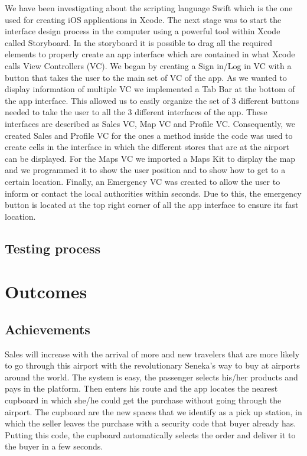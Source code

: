 \documentclass[12pt]{article}
\begin{document}
We have been investigating about the scripting language Swift which is the one used for creating iOS applications in Xcode. The next stage was to start the interface design process in the computer using a powerful tool within Xcode called Storyboard. In the storyboard it is possible to drag all the required elements to properly create an app interface which are contained in what Xcode calls View Controllers (VC). We began by creating a Sign in/Log in VC with a button that takes the user to the main set of VC of the app. As we wanted to display information of multiple VC we implemented a Tab Bar at the bottom of the app interface. This allowed us to easily organize the set of 3 different buttons needed to take the user to all the 3 different interfaces of the app. These interfaces are described as Sales VC, Map VC and Profile VC. Consequently, we created Sales and Profile VC for the ones a method inside the code was used to create cells in the interface in which the different stores that are at the airport can be displayed. For the Maps VC we imported a Maps Kit to display the map and we programmed it to show the user position and to show how to get to a certain location. Finally, an Emergency VC was created to allow the user to inform or contact the local authorities within seconds. Due to this, the emergency button is located at the top right corner of all the app interface to ensure its fast location.\\

\subsection{Testing process}



\section{Outcomes}

\subsection{Achievements}

Sales will increase with the arrival of more and new travelers that are more likely to go through this airport with the revolutionary Seneka's way to buy at airports around the world. The system is easy, the passenger selects his/her products and pays in the platform. Then enters his route and the app locates the nearest cupboard in which she/he could get the purchase without going through the airport. The cupboard are the new spaces that we identify as a pick up station, in which the seller leaves the purchase with a security code that buyer already has. Putting this code, the cupboard automatically selects the order and deliver it to the buyer in a few seconds.\\
\end{document}
